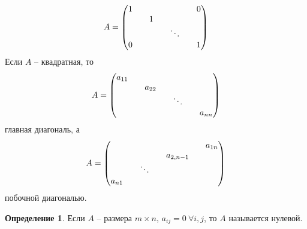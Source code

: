 \documentclass[a4paper, 12pt]{article}
\theoremstyle{definition}
\newtheorem*{definition}{Определение}
\begin{document}
    $$A = \begin{pmatrix}
        1 && \null && \null && 0\\
        \null && 1 && \null && \null\\
        \null && \null && \ddots && \null\\
        0 && \null && \null && 1
    \end{pmatrix}$$
    Если  $A$ -- квадратная, то 
    $$A = \begin{pmatrix}
        a_{11} && \null && \null && \null\\
        \null && a_{22} && \null && \null\\
        \null && \null && \ddots && \null\\
        \null && \null && \null && a_{nn}
    \end{pmatrix}$$ 
    главная диагональ, а 
    $$A = \begin{pmatrix}
        \null && \null && \null && a_{1n}\\
        \null && \null && a_{2,n-1} && \null\\
        \null && \ddots && \null && \null\\
        a_{n1} && \null && \null && \null
    \end{pmatrix}$$
    побочной диагональю.
    \begin{definition}
        Если $A$ -- размера $m\times n$, $a_{ij} = 0\ \forall i,j$, то $A$ называется нулевой.   
    \end{definition}
\end{document}
